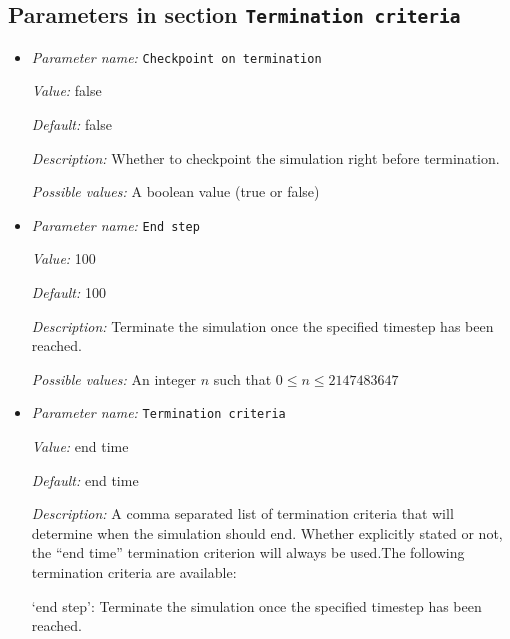 \subsection{Parameters in section \tt Termination criteria}
\label{parameters:Termination_20criteria}

\begin{itemize}
\item {\it Parameter name:} {\tt Checkpoint on termination}
\label{parameters:Termination criteria/Checkpoint on termination}
\label{parameters:Termination_20criteria/Checkpoint_20on_20termination}


{\it Value:} false


{\it Default:} false


{\it Description:} Whether to checkpoint the simulation right before termination.


{\it Possible values:} A boolean value (true or false)
\item {\it Parameter name:} {\tt End step}
\label{parameters:Termination criteria/End step}
\label{parameters:Termination_20criteria/End_20step}


{\it Value:} 100


{\it Default:} 100


{\it Description:} Terminate the simulation once the specified timestep has been reached.


{\it Possible values:} An integer $n$ such that $0\leq n \leq 2147483647$
\item {\it Parameter name:} {\tt Termination criteria}
\label{parameters:Termination criteria/Termination criteria}
\label{parameters:Termination_20criteria/Termination_20criteria}


{\it Value:} end time


{\it Default:} end time


{\it Description:} A comma separated list of termination criteria that will determine when the simulation should end. Whether explicitly stated or not, the ``end time'' termination criterion will always be used.The following termination criteria are available:

`end step': Terminate the simulation once the specified timestep has been reached. 


\end{itemize}

